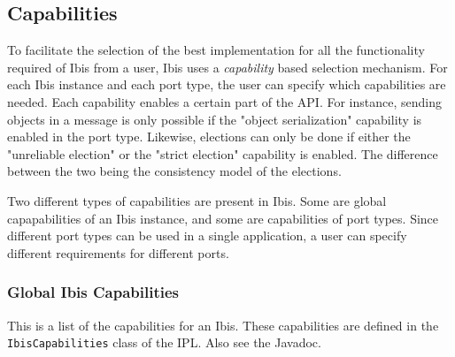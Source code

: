 \documentclass[10pt]{article}
\begin{document}
\subsection{Capabilities}

To facilitate the selection of the best implementation for all the
functionality required of Ibis from a user, Ibis uses a
\emph{capability} based selection mechanism. For each Ibis instance and
each port type, the user can specify which capabilities are needed. Each
capability enables a certain part of the API. For instance, sending
objects in a message is only possible if the "object serialization"
capability is enabled in the port type. Likewise, elections can only be
done if either the "unreliable election" or the "strict election"
capability is enabled. The difference between the two being the
consistency model of the elections. 

Two different types of capabilities are present in Ibis. Some are global
capapabilities of an Ibis instance, and some are capabilities of port
types. Since different port types can be used in a single application, a
user can specify different requirements for different ports.

\subsubsection{Global Ibis Capabilities}

This is a list of the capabilities for an Ibis. These capabilities are
defined in the \texttt{IbisCapabilities} class of the IPL. Also see the
Javadoc.  
\end{document}
